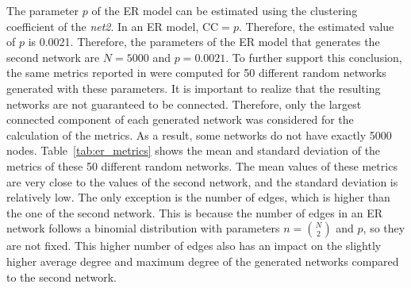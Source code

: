 \documentclass{article}
\begin{document}
The parameter $p$ of the ER model can be estimated using the clustering coefficient of the \textit{net2}. In an ER model, $\text{CC} = p$. Therefore, the estimated value of $p$ is 0.0021. Therefore, the parameters of the ER model that generates the second network are $N=5000$ and $p=0.0021$. To further support this conclusion, the same metrics reported in  were computed for 50 different random networks generated with these parameters. It is important to realize that the resulting networks are not guaranteed to be connected. Therefore, only the largest connected component of each generated network was considered for the calculation of the metrics. As a result, some networks do not have exactly 5000 nodes. Table~\ref{tab:er_metrics} shows the mean and standard deviation of the metrics of these 50 different random networks. The mean values of these metrics are very close to the values of the second network, and the standard deviation is relatively low. The only exception is the number of edges, which is higher than the one of the second network. This is because the number of edges in an ER network follows a binomial distribution with parameters $n = \binom{N}{2}$ and $p$, so they are not fixed. This higher number of edges also has an impact on the slightly higher average degree and maximum degree of the generated networks compared to the second network.
\end{document}
